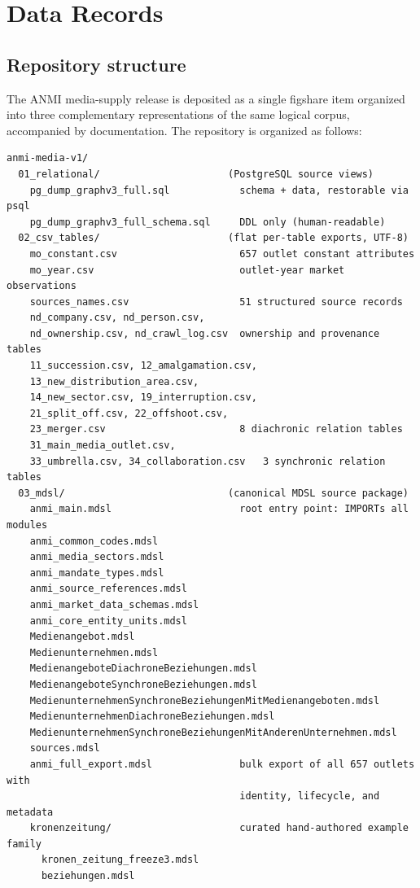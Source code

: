 \documentclass[11pt]{article}
\begin{document}
\section{Data Records}

\subsection{Repository structure}

The ANMI media-supply release is deposited as a single figshare item organized into three complementary representations of the same logical corpus, accompanied by documentation. The repository is organized as follows:

\begin{verbatim}
anmi-media-v1/
  01_relational/                      (PostgreSQL source views)
    pg_dump_graphv3_full.sql            schema + data, restorable via psql
    pg_dump_graphv3_full_schema.sql     DDL only (human-readable)
  02_csv_tables/                      (flat per-table exports, UTF-8)
    mo_constant.csv                     657 outlet constant attributes
    mo_year.csv                         outlet-year market observations
    sources_names.csv                   51 structured source records
    nd_company.csv, nd_person.csv,
    nd_ownership.csv, nd_crawl_log.csv  ownership and provenance tables
    11_succession.csv, 12_amalgamation.csv,
    13_new_distribution_area.csv,
    14_new_sector.csv, 19_interruption.csv,
    21_split_off.csv, 22_offshoot.csv,
    23_merger.csv                       8 diachronic relation tables
    31_main_media_outlet.csv,
    33_umbrella.csv, 34_collaboration.csv   3 synchronic relation tables
  03_mdsl/                            (canonical MDSL source package)
    anmi_main.mdsl                      root entry point: IMPORTs all modules
    anmi_common_codes.mdsl
    anmi_media_sectors.mdsl
    anmi_mandate_types.mdsl
    anmi_source_references.mdsl
    anmi_market_data_schemas.mdsl
    anmi_core_entity_units.mdsl
    Medienangebot.mdsl
    Medienunternehmen.mdsl
    MedienangeboteDiachroneBeziehungen.mdsl
    MedienangeboteSynchroneBeziehungen.mdsl
    MedienunternehmenSynchroneBeziehungenMitMedienangeboten.mdsl
    MedienunternehmenDiachroneBeziehungen.mdsl
    MedienunternehmenSynchroneBeziehungenMitAnderenUnternehmen.mdsl
    sources.mdsl
    anmi_full_export.mdsl               bulk export of all 657 outlets with
                                        identity, lifecycle, and metadata
    kronenzeitung/                      curated hand-authored example family
      kronen_zeitung_freeze3.mdsl
      beziehungen.mdsl
\end{verbatim}
\end{document}
